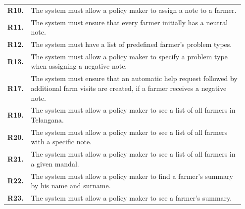 \begin{longtable}{p{0.07\linewidth} p{0.88\linewidth}}
	\textbf{R10.} & The system must allow a policy maker to assign a note to a farmer.\\
	\textbf{R11.} & The system must ensure that every farmer initially has a neutral note.\\
	\textbf{R12.} & The system must have a list of predefined farmer's problem types.\\
    \textbf{R13.} & The system must allow a policy maker to specify a problem type when assigning a negative note.\\
    \textbf{R17.} & The system must ensure that an automatic help request followed by additional farm visits are created, if a farmer receives a negative note.\\
	\textbf{R19.} & The system must allow a policy maker to see a list of all farmers in Telangana.\\
	\textbf{R20.} & The system must allow a policy maker to see a list of all farmers with a specific note.\\
	\textbf{R21.} & The system must allow a policy maker to see a list of all farmers in a given mandal.\\
	\textbf{R22.} & The system must allow a policy maker to find a farmer's summary by his name and surname.\\
	\textbf{R23.} & The system must allow a policy maker to see a farmer's summary.\\
	

\end{longtable}

